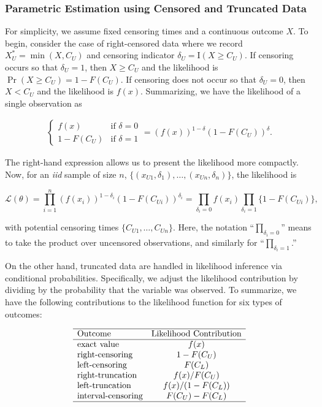 \documentclass[]{book}
\theoremstyle{definition}
\theoremstyle{definition}
\theoremstyle{definition}
\theoremstyle{remark}
\begin{document}
\subsubsection{Parametric Estimation using Censored and Truncated
Data}\label{parametric-estimation-using-censored-and-truncated-data}

For simplicity, we assume fixed censoring times and a continuous outcome
\(X\). To begin, consider the case of right-censored data where we
record \(X_U^{\ast}= \min(X, C_U)\) and censoring indicator
\(\delta_U= \mathrm{I}(X \geq C_U)\). If censoring occurs so that
\(\delta_U=1\), then \(X \geq C_U\) and the likelihood is
\(\Pr(X \geq C_U) = 1-F(C_U)\). If censoring does not occur so that
\(\delta_U=0\), then \(X < C_U\) and the likelihood is \(f(x)\).
Summarizing, we have the likelihood of a single observation as

\[\begin{aligned}
\left\{
\begin{array}{ll}
f(x) & \text{if } \delta = 0 \\
1-F(C_U) & \text{if }\delta=1
\end{array}
\right. = \left( f(x)\right)^{1-\delta} \left(1-F(C_U)\right)^{\delta} .
\end{aligned}\]

The right-hand expression allows us to present the likelihood more
compactly. Now, for an \emph{iid} sample of size \(n\),
\(\{ (x_{U1},\delta_1), \ldots,(x_{Un}, \delta_n) \}\), the likelihood
is

\[\mathcal{L}(\theta) = \prod_{i=1}^n \left( f(x_i)\right)^{1-\delta_i} \left(1-F(C_{Ui})\right)^{\delta_i} = \prod_{\delta_i=0} f(x_i) \prod_{\delta_i=1} \{1-F(C_{Ui})\},\]

with potential censoring times \(\{ C_{U1}, \ldots,C_{Un} \}\). Here,
the notation ``\(\prod_{\delta_i=0}\)'' means to take the product over
uncensored observations, and similarly for ``\(\prod_{\delta_i=1}\).''

On the other hand, truncated data are handled in likelihood inference
via conditional probabilities. Specifically, we adjust the likelihood
contribution by dividing by the probability that the variable was
observed. To summarize, we have the following contributions to the
likelihood function for six types of outcomes:

\[\begin{array}{lc}
\hline
\text{Outcome} & \text{Likelihood Contribution} \\
\hline 
\text{exact value} & f(x) \\
\text{right-censoring} & 1-F(C_U) \\
\text{left-censoring} & F(C_L) \\
\text{right-truncation} & f(x)/F(C_U) \\
\text{left-truncation} & f(x)/(1-F(C_L)) \\
\text{interval-censoring} & F(C_U)-F(C_L) \\
\hline
\end{array}\]
\end{document}
